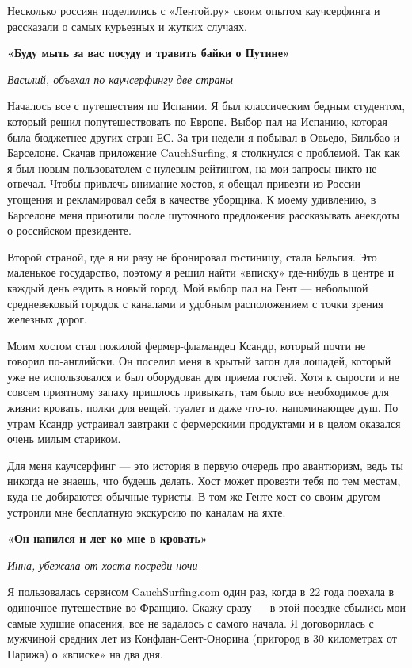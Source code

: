 Несколько россиян поделились с «Лентой.ру» своим опытом каучсерфинга и рассказали о самых курьезных и жутких случаях.

\textbf{«Буду мыть за вас посуду и травить байки о Путине»}

\textit{Василий, объехал по каучсерфингу две страны}

Началось все с путешествия по Испании. Я был классическим бедным студентом, который решил попутешествовать по Европе. Выбор пал на Испанию, которая была бюджетнее других стран ЕС. За три недели я побывал в Овьедо, Бильбао и Барселоне. Скачав приложение CauchSurfing, я столкнулся с проблемой. Так как я был новым пользователем с нулевым рейтингом, на мои запросы никто не отвечал. Чтобы привлечь внимание хостов, я обещал привезти из России угощения и рекламировал себя в качестве уборщика. К моему удивлению, в Барселоне меня приютили после шуточного предложения рассказывать анекдоты о российском президенте.

Второй страной, где я ни разу не бронировал гостиницу, стала Бельгия. Это маленькое государство, поэтому я решил найти «вписку» где-нибудь в центре и каждый день ездить в новый город. Мой выбор пал на Гент — небольшой средневековый городок с каналами и удобным расположением с точки зрения железных дорог.

Моим хостом стал пожилой фермер-фламандец Ксандр, который почти не говорил по-английски. Он поселил меня в крытый загон для лошадей, который уже не использовался и был оборудован для приема гостей. Хотя к сырости и не совсем приятному запаху пришлось привыкать, там было все необходимое для жизни: кровать, полки для вещей, туалет и даже что-то, напоминающее душ. По утрам Ксандр устраивал завтраки с фермерскими продуктами и в целом оказался очень милым стариком.

Для меня каучсерфинг — это история в первую очередь про авантюризм, ведь ты никогда не знаешь, что будешь делать. Хост может провезти тебя по тем местам, куда не добираются обычные туристы. В том же Генте хост со своим другом устроили мне бесплатную экскурсию по каналам на яхте.

\textbf{«Он напился и лег ко мне в кровать»}

\textit{Инна, убежала от хоста посреди ночи}

Я пользовалась сервисом CauchSurfing.com один раз, когда в 22 года поехала в одиночное путешествие во Францию. Скажу сразу — в этой поездке сбылись мои самые худшие опасения, все не задалось с самого начала. Я договорилась с мужчиной средних лет из Конфлан-Сент-Онорина (пригород в 30 километрах от Парижа) о «вписке» на два дня.

